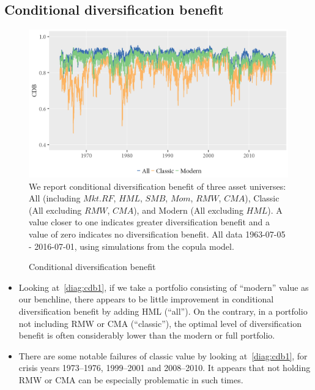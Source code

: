 \subsection{Conditional diversification benefit}
\begin{figure}[H]
  \caption{Conditional diversification benefit}
  \label{diag:cdb1}
  \centering
  \begin{minipage}{\textwidth}
  \includegraphics[scale=1]{graphics/CDB_dynamic_ghskt.png}  
  \vspace{3mm}
  \footnotesize
  We report conditional diversification benefit of three asset universes: All (including $Mkt.RF$, $HML$, $SMB$, $Mom$, $RMW$, $CMA$), Classic (All excluding $RMW$, $CMA$), and Modern (All excluding $HML$). A value closer to one indicates greater diversification benefit and a value of zero indicates no diversification benefit. All data 1963-07-05 - 2016-07-01, using simulations from the copula model.
  \end{minipage}
\end{figure}
\begin{itemize}
  \item Looking at~\autoref{diag:cdb1}, if we take a portfolio consisting of ``modern'' value as our benchline, there appears to be little improvement in conditional diversification benefit by adding HML (``all''). On the contrary, in a portfolio not including RMW or CMA (``classic''), the optimal level of diversification benefit is often considerably lower than the modern or full portfolio.
  \item There are some notable failures of classic value by looking at~\autoref{diag:cdb1}, for crisis years 1973--1976, 1999--2001 and 2008--2010. It appears that not holding RMW or CMA can be especially problematic in such times.
\end{itemize}
